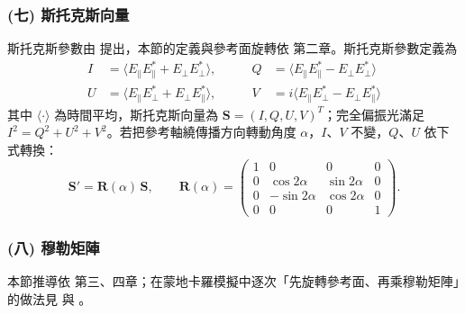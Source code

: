 \subsubsection*{(七) 斯托克斯向量}
斯托克斯參數由 \textcite{stokes1852Composition} 提出，本節的定義與參考面旋轉依 \textcite{bohren1983Absorption} 第二章。斯托克斯參數定義為
\begin{equation}
    \begin{aligned}
        I &= \langle E_{\parallel} E_{\parallel}^* + E_{\perp} E_{\perp}^* \rangle, \qquad & Q &= \langle E_{\parallel} E_{\parallel}^* - E_{\perp} E_{\perp}^* \rangle \\
        U &= \langle E_{\parallel} E_{\perp}^* + E_{\perp} E_{\parallel}^* \rangle, \qquad & V &= i \langle E_{\parallel} E_{\perp}^* - E_{\perp} E_{\parallel}^* \rangle
    \end{aligned} \label{eq:stokes_def}
\end{equation}
其中 $\langle\cdot\rangle$ 為時間平均，斯托克斯向量為 $\mathbf{S} = (I, Q, U, V)^{T}$；完全偏振光滿足 $I^2 = Q^2 + U^2 + V^2$。若把參考軸繞傳播方向轉動角度 $\alpha$，$I$、$V$ 不變，$Q$、$U$ 依下式轉換：
\begin{equation}
    \mathbf{S}' = \mathbf{R}(\alpha)\, \mathbf{S}, \qquad \mathbf{R}(\alpha) = \begin{pmatrix} 1 & 0 & 0 & 0 \\ 0 & \cos 2\alpha & \sin 2\alpha & 0 \\ 0 & -\sin 2\alpha & \cos 2\alpha & 0 \\ 0 & 0 & 0 & 1 \end{pmatrix} . \label{eq:rot}
\end{equation}

\subsubsection*{(八) 穆勒矩陣}
本節推導依 \textcite{bohren1983Absorption} 第三、四章；在蒙地卡羅模擬中逐次「先旋轉參考面、再乘穆勒矩陣」的做法見 \textcite{ramellaRoman2005ThreeMC} 與 \textcite{bartel2000MonteCarlo}。

